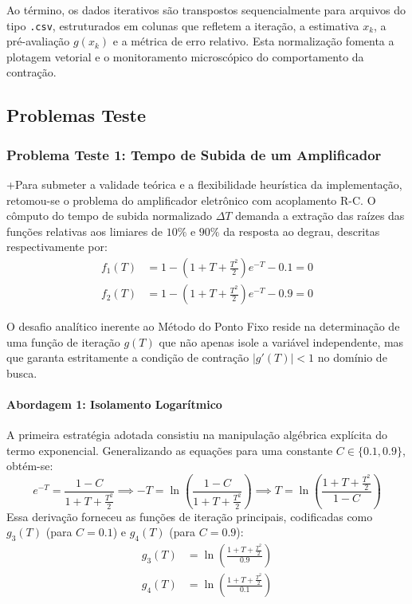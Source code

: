 Ao término, os dados iterativos são transpostos sequencialmente para arquivos do tipo \texttt{.csv}, estruturados em colunas que refletem a iteração, a estimativa $x_k$, a pré-avaliação $g(x_k)$ e a métrica de erro relativo. Esta normalização fomenta a plotagem vetorial e o monitoramento microscópico do comportamento da contração.

\subsection{Problemas Teste}
\label{subsec:problemas_testes_ponto_fixo}

\subsubsection{Problema Teste 1: Tempo de Subida de um Amplificador}
\label{subsubsec:problema_teste_1_ponto_fixo}

+Para submeter a validade teórica e a flexibilidade heurística da implementação, retomou-se o problema do amplificador eletrônico com acoplamento R-C. O cômputo do tempo de subida normalizado $\Delta T$ demanda a extração das raízes das funções relativas aos limiares de $10\%$ e $90\%$ da resposta ao degrau, descritas respectivamente por:
\begin{align}
    f_1(T) &= 1 - \left(1 + T + \frac{T^2}{2}\right)e^{-T} - 0.1 = 0 \label{eq:f1_ponto_fixo} \\
    f_2(T) &= 1 - \left(1 + T + \frac{T^2}{2}\right)e^{-T} - 0.9 = 0 \label{eq:f2_ponto_fixo}
\end{align}

O desafio analítico inerente ao Método do Ponto Fixo reside na determinação de uma função de iteração $g(T)$ que não apenas isole a variável independente, mas que garanta estritamente a condição de contração $|g'(T)| < 1$ no domínio de busca. 

\paragraph{Abordagem 1: Isolamento Logarítmico}
A primeira estratégia adotada consistiu na manipulação algébrica explícita do termo exponencial. Generalizando as equações para uma constante $C \in \{0.1, 0.9\}$, obtém-se:
\begin{equation}
    e^{-T} = \frac{1 - C}{1 + T + \frac{T^2}{2}} \implies -T = \ln\left(\frac{1 - C}{1 + T + \frac{T^2}{2}}\right) \implies T = \ln\left(\frac{1 + T + \frac{T^2}{2}}{1 - C}\right)
\end{equation}
Essa derivação forneceu as funções de iteração principais, codificadas como $g_3(T)$ (para $C=0.1$) e $g_4(T)$ (para $C=0.9$):
\begin{align}
    g_3(T) &= \ln\left(\frac{1 + T + \frac{T^2}{2}}{0.9}\right) \label{eq:g3_ponto_fixo} \\
    g_4(T) &= \ln\left(\frac{1 + T + \frac{T^2}{2}}{0.1}\right) \label{eq:g4_ponto_fixo}
\end{align}

